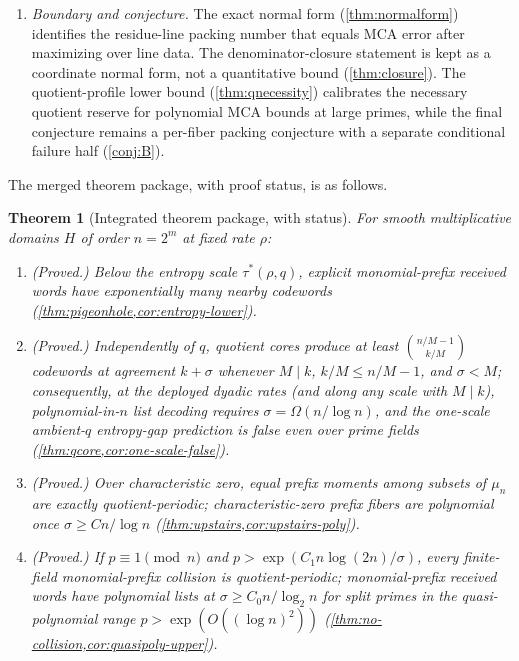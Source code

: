 \documentclass[11pt]{article}
\newtheorem{theorem}{Theorem}[section]
\theoremstyle{definition}
\newcommand{\taustar}{\tau^{*}}
\begin{document}
\begin{enumerate}[leftmargin=2em]
\item \emph{Boundary and conjecture.}  The exact normal form (\cref{thm:normalform}) identifies the residue-line packing number that equals MCA error after maximizing over line data.  The denominator-closure statement is kept as a coordinate normal form, not a quantitative bound (\cref{thm:closure}).  The quotient-profile lower bound (\cref{thm:qnecessity}) calibrates the necessary quotient reserve for polynomial MCA bounds at large primes, while the final conjecture remains a per-fiber packing conjecture with a separate conditional failure half (\cref{conj:B}).
\end{enumerate}


The merged theorem package, with proof status, is as follows.

\begin{theorem}[Integrated theorem package, with status]\label{thm:integrated-package}
For smooth multiplicative domains $H$ of order $n=2^m$ at fixed rate $\rho$:
\begin{enumerate}[label=\textup{(\alph*)},leftmargin=2.4em]
\item \textup{(Proved.)}  Below the entropy scale $\taustar(\rho,q)$, explicit monomial-prefix received words have exponentially many nearby codewords (\cref{thm:pigeonhole,cor:entropy-lower}).
\item \textup{(Proved.)}  Independently of $q$, quotient cores produce at least $\binom{n/M-1}{k/M}$ codewords at agreement $k+\sigma$ whenever $M\mid k$, $k/M\le n/M-1$, and $\sigma<M$; consequently, at the deployed dyadic rates (and along any scale with $M\mid k$), polynomial-in-$n$ list decoding requires $\sigma=\Omega(n/\log n)$, and the one-scale ambient-$q$ entropy-gap prediction is false even over prime fields (\cref{thm:qcore,cor:one-scale-false}).
\item \textup{(Proved.)}  Over characteristic zero, equal prefix moments among subsets of $\mu_n$ are exactly quotient-periodic; characteristic-zero prefix fibers are polynomial once $\sigma\ge Cn/\log n$ (\cref{thm:upstairs,cor:upstairs-poly}).
\item \textup{(Proved.)}  If $p\equiv1\pmod n$ and $p>\exp(C_1n\log(2n)/\sigma)$, every finite-field monomial-prefix collision is quotient-periodic; monomial-prefix received words have polynomial lists at $\sigma\ge C_0n/\log_2n$ for split primes in the quasi-polynomial range $p>\exp(O((\log n)^2))$ (\cref{thm:no-collision,cor:quasipoly-upper}).

\end{enumerate}
\end{theorem}
\end{document}
